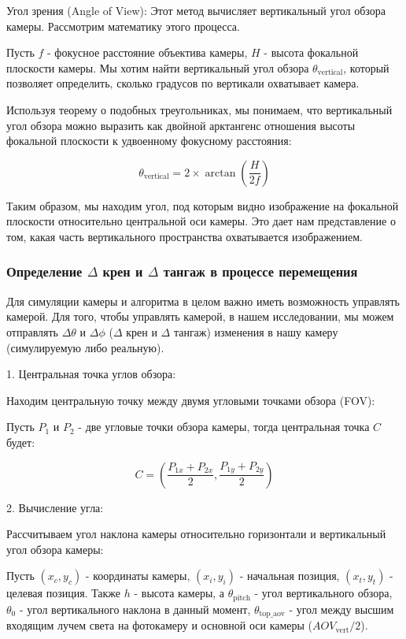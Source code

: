 Угол зрения (Angle of View): 
Этот метод вычисляет вертикальный угол обзора камеры. Рассмотрим математику этого процесса.

Пусть $f$ - фокусное расстояние объектива камеры, $H$ - высота фокальной плоскости камеры. Мы хотим найти вертикальный угол обзора $\theta_{\text{vertical}}$, который позволяет определить, сколько градусов по вертикали охватывает камера.

Используя теорему о подобных треугольниках, мы понимаем, что вертикальный угол обзора можно выразить как двойной арктангенс отношения высоты фокальной плоскости к удвоенному фокусному расстояния:

$$
\theta_{\text{vertical}} = 2 \times \arctan \left( \frac{H}{2f} \right)
$$

Таким образом, мы находим угол, под которым видно изображение на фокальной плоскости относительно центральной оси камеры. Это дает нам представление о том, какая часть вертикального пространства охватывается изображением.

\subsubsection{Определение $\Delta$ крен и $\Delta$ тангаж в процессе перемещения}
Для симуляции камеры и алгоритма в целом важно иметь возможность управлять камерой. 
Для того, чтобы управлять камерой, в нашем исследовании, мы можем отправлять $\Delta \theta$  и $\Delta \phi$ ($\Delta$ крен и $\Delta$ тангаж) изменения в нашу камеру (симулируемую либо реальную). 


1. Центральная точка углов обзора:

   Находим центральную точку между двумя угловыми точками обзора (FOV):

   Пусть  $ P_1  $ и  $ P_2  $ - две угловые точки обзора камеры, тогда центральная точка  $ C  $ будет:

    $$
   C = \left( \frac{P_{1x} + P_{2x}}{2}, \frac{P_{1y} + P_{2y}}{2} \right)
    $$

2. Вычисление угла:

   Рассчитываем угол наклона камеры относительно горизонтали и вертикальный угол обзора камеры:

   Пусть  $ (x_c, y_c)  $ - координаты камеры,  $ (x_i, y_i)  $ - начальная позиция,  $ (x_t, y_t)  $ - целевая позиция. Также  $ h  $ - высота камеры, а  $ \theta_{\text{pitch}}  $ - угол вертикального обзора, $\theta_0$ - угол вертикального наклона в данный момент, $\theta_{\text{top\_aov}}$ - угол между высшим входящим лучем света на фотокамеру и основной оси камеры ($AOV_{\text{vert}}/2$).   

